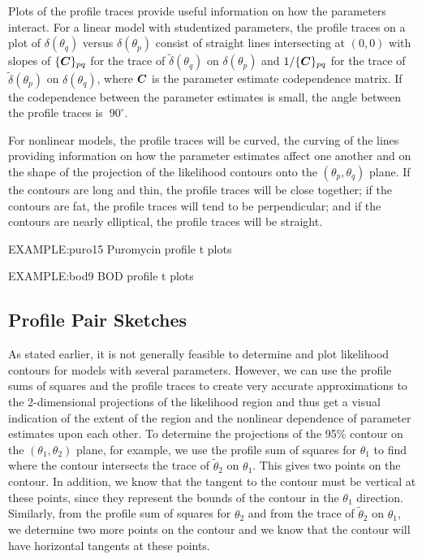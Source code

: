 Plots of the profile traces provide useful information on how the
parameters interact.
For a linear model with studentized parameters, the profile traces
on a plot of $\delta ( \theta_q )$ versus $\delta ( \theta_p )$
consist of straight lines intersecting at
$( 0 ,  0 )$ with slopes of $\{ {\boldsymbol C} \}_{pq}$ for
the trace of $\tilde \delta ( \theta_q )$ on $\delta ( \theta_p )$
and $1/ \{ {\boldsymbol C} \}_{pq}$ for the trace of $\tilde \delta ( \theta_p )$
on $\delta ( \theta_q )$, where ${\boldsymbol C}$
is the parameter estimate codependence matrix.
If the codependence between the parameter estimates is small, the
angle between the profile traces is $~90^\circ$.

For nonlinear models, the profile traces will be curved,
the curving of the lines providing information on
how the parameter estimates affect one another and on
the shape of the projection of the likelihood
contours onto the $( \theta_p , \theta_q )$ plane.
If the contours are long and thin, the profile traces will
be close together; if the contours are fat, the profile
traces will tend to be perpendicular; and if the contours are
nearly elliptical, the profile traces will be straight.

EXAMPLE:puro15 Puromycin profile t plots

EXAMPLE:bod9 BOD profile t plots

\subsection{Profile Pair Sketches}

As stated earlier, it is not generally feasible to determine and plot
likelihood contours for models with several parameters.
However, we can use the profile sums of squares and the profile traces
to create very accurate approximations to the 2-dimensional
projections of the likelihood region and thus get a visual indication
of the extent of the region and the nonlinear dependence of parameter
estimates upon each other.
To determine the projections of the 95\% contour on the
$( \theta_1 , \theta_2 )$ plane, for example, we use
the profile sum of squares for $\theta_{1}$ to find where the contour
intersects the trace of $\tilde \theta_{2}$ on $\theta_{1}$.
This gives two points on the contour.
In addition, we know that the tangent to the contour must be vertical
at these points, since they represent the bounds of the contour in the
$\theta_{1}$ direction.
Similarly, from the profile sum of squares for $\theta_{2}$ and from
the trace of $\tilde \theta_{2}$ on $\theta_{1}$, we determine two
more points on the contour and we know that the contour will have
horizontal tangents at these points.

